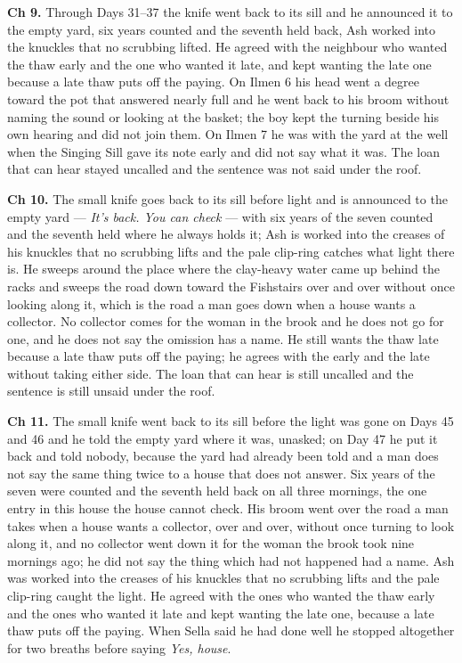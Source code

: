 \documentclass{design/chronicle}
\begin{document}
{\textbf{Ch 9.} Through Days 31–37 the knife went back to its sill and he announced it to the empty yard, six years counted and the seventh held back, Ash worked into the knuckles that no scrubbing lifted. He agreed with the neighbour who wanted the thaw early and the one who wanted it late, and kept wanting the late one because a late thaw puts off the paying. On Ilmen 6 his head went a degree toward the pot that answered nearly full and he went back to his broom without naming the sound or looking at the basket; the boy kept the turning beside his own hearing and did not join them. On Ilmen 7 he was with the yard at the well when the Singing Sill gave its note early and did not say what it was. The loan that can hear stayed uncalled and the sentence was not said under the roof.

\textbf{Ch 10.} The small knife goes back to its sill before light and is announced to the empty yard --- \emph{It’s back. You can check} --- with six years of the seven counted and the seventh held where he always holds it; Ash is worked into the creases of his knuckles that no scrubbing lifts and the pale clip-ring catches what light there is. He sweeps around the place where the clay-heavy water came up behind the racks and sweeps the road down toward the Fishstairs over and over without once looking along it, which is the road a man goes down when a house wants a collector. No collector comes for the woman in the brook and he does not go for one, and he does not say the omission has a name. He still wants the thaw late because a late thaw puts off the paying; he agrees with the early and the late without taking either side. The loan that can hear is still uncalled and the sentence is still unsaid under the roof.

\textbf{Ch 11.} The small knife went back to its sill before the light was gone on Days 45 and 46 and he told the empty yard where it was, unasked; on Day 47 he put it back and told nobody, because the yard had already been told and a man does not say the same thing twice to a house that does not answer. Six years of the seven were counted and the seventh held back on all three mornings, the one entry in this house the house cannot check. His broom went over the road a man takes when a house wants a collector, over and over, without once turning to look along it, and no collector went down it for the woman the brook took nine mornings ago; he did not say the thing which had not happened had a name. Ash was worked into the creases of his knuckles that no scrubbing lifts and the pale clip-ring caught the light. He agreed with the ones who wanted the thaw early and the ones who wanted it late and kept wanting the late one, because a late thaw puts off the paying. When Sella said he had done well he stopped altogether for two breaths before saying \emph{Yes, house}.

}
\end{document}
